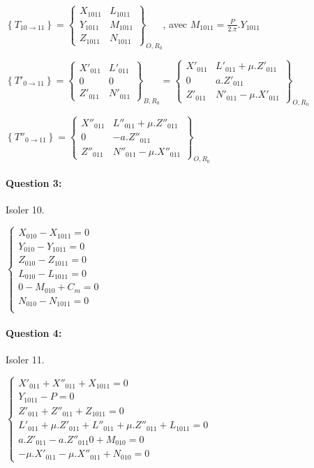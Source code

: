 $\left\{T_{10\rightarrow 11}\right\}=\left\{
\begin{array}{cc}
X_{1011} & L_{1011} \\
Y_{1011} & M_{1011} \\
Z_{1011} & N_{1011}
\end{array}
\right\}_{O,R_0}$, avec $M_{1011}=\frac{P}{2.\pi}.Y_{1011}$

$\left\{T'_{0\rightarrow 11}\right\}=\left\{
\begin{array}{cc}
X'_{011} & L'_{011} \\
0 & 0 \\
Z'_{011} & N'_{011}
\end{array}
\right\}_{B,R_0}=\left\{
\begin{array}{cc}
X'_{011} & L'_{011}+\mu.Z'_{011} \\
0 & a.Z'_{011} \\
Z'_{011} & N'_{011}-\mu.X'_{011}
\end{array}
\right\}_{O,R_0}$

$\left\{T''_{0\rightarrow 11}\right\}=\left\{
\begin{array}{cc}
X''_{011} & L''_{011}+\mu.Z''_{011} \\
0 & -a.Z''_{011} \\
Z''_{011} & N''_{011}-\mu.X''_{011}
\end{array}
\right\}_{O,R_0}$


\paragraph{Question 3:}

Isoler 10.

$\left\{\begin{array}{l}
X_{010}-X_{1011}=0 \\
Y_{010}-Y_{1011}=0 \\
Z_{010}-Z_{1011}=0 \\
L_{010}-L_{1011}=0 \\
0-M_{010}+C_m=0  \\
N_{010}-N_{1011}=0 \\
\end{array}\right.$

\paragraph{Question 4:}

Isoler 11.

$\left\{\begin{array}{l}
X'_{011}+X''_{011}+X_{1011}=0 \\
Y_{1011}-P=0 \\
Z'_{011}+Z''_{011}+Z_{1011}=0 \\
L'_{011}+\mu.Z'_{011}+L''_{011}+\mu.Z''_{011}+L_{1011}=0 \\
a.Z'_{011}-a.Z''_{011}0+M_{010}=0  \\
-\mu.X'_{011}-\mu.X''_{011}+N_{010}=0
\end{array}\right.$

